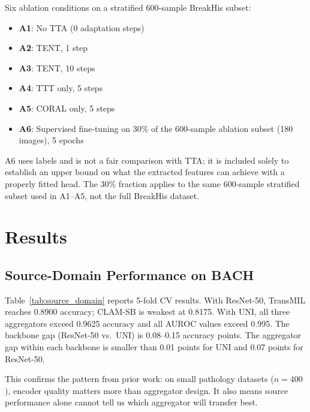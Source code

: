 \documentclass[conference]{IEEEtran}
\begin{document}
Six ablation conditions on a stratified 600-sample BreakHis subset:

\begin{itemize}
    \item \textbf{A1}: No TTA (0 adaptation steps)
    \item \textbf{A2}: TENT, 1 step
    \item \textbf{A3}: TENT, 10 steps
    \item \textbf{A4}: TTT only, 5 steps
    \item \textbf{A5}: CORAL only, 5 steps
    \item \textbf{A6}: Supervised fine-tuning on 30\% of the 600-sample ablation subset (180 images), 5 epochs
\end{itemize}

A6 uses labels and is not a fair comparison with TTA; it is included solely to establish an upper bound on what the extracted features can achieve with a properly fitted head. The 30\% fraction applies to the same 600-sample stratified subset used in A1--A5, not the full BreakHis dataset.

\section{Results}
\label{sec:results}

\subsection{Source-Domain Performance on BACH}

Table~\ref{tab:source_domain} reports 5-fold CV results. With ResNet-50, TransMIL reaches 0.8900 accuracy; CLAM-SB is weakest at 0.8175. With UNI, all three aggregators exceed 0.9625 accuracy and all AUROC values exceed 0.995. The backbone gap (ResNet-50 vs.\ UNI) is 0.08--0.15 accuracy points. The aggregator gap within each backbone is smaller than 0.01 points for UNI and 0.07 points for ResNet-50.

This confirms the pattern from prior work: on small pathology datasets ($n=400$), encoder quality matters more than aggregator design. It also means source performance alone cannot tell us which aggregator will transfer best.
\end{document}

